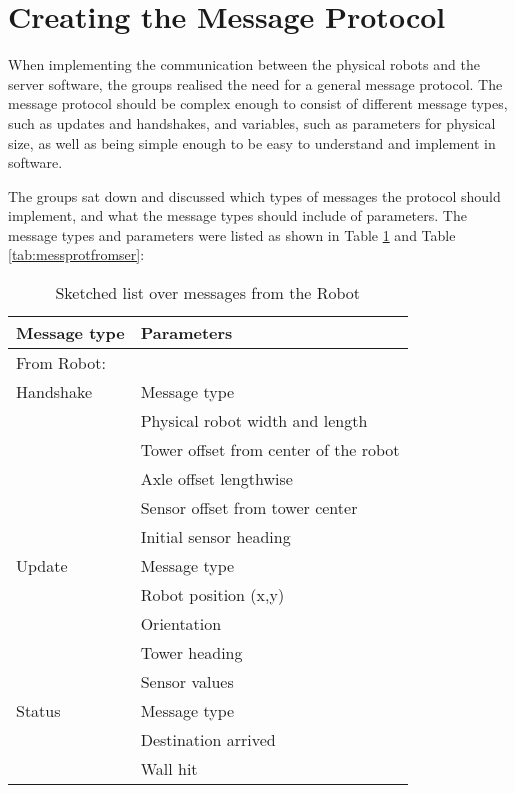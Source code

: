 \section{Creating the Message Protocol}
When implementing the communication between the physical robots and the server software, the groups realised the need for a general message protocol. The message protocol should be complex enough to consist of different message types, such as updates and handshakes, and variables, such as parameters for physical size, as well as being simple enough to be easy to understand and implement in software.

The groups sat down and discussed which types of messages the protocol should implement, and what the message types should include of parameters. The message types and parameters were listed as shown in Table \ref{tab:messprotfromrob} and Table \ref{tab:messprotfromser}:

\begin{table}[ht]
\begin{center}
 \begin{tabular}{|l | l|} 
 \hline
 Message type       &    Parameters \\
 \hline
 \hline
 From Robot: & \\
 \hline
 Handshake          &   Message type \\
                     &    Physical robot width and length  \\
                    &   Tower offset from center of the robot\\
                    &    Axle offset lengthwise \\
                    &    Sensor offset from tower center \\
                    &    Initial sensor heading \\
 \hline
 Update              &   Message type \\
                    &   Robot position (x,y) \\
                    &   Orientation \\
                    &   Tower heading \\
                    &    Sensor values \\
 \hline
 Status                &   Message type \\
                     &    Destination arrived \\
                    &   Wall hit \\
 \hline
 \end{tabular}
\end{center}
\caption{Sketched list over messages from the Robot}
\label{tab:messprotfromrob}
\end{table}

